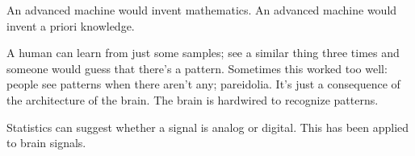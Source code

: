 An advanced machine would invent mathematics.
An advanced machine would invent a priori knowledge.

A human can learn from just some samples;
see a similar thing three times and someone would guess that there's a pattern.
Sometimes this worked too well: people see patterns when there aren't any;
pareidolia.
It's just a consequence of the architecture of the brain.
The brain is hardwired to recognize patterns.

Statistics can suggest whether a signal is analog or digital.
This has been applied to brain signals. \cite{mochizuki2014analog}
